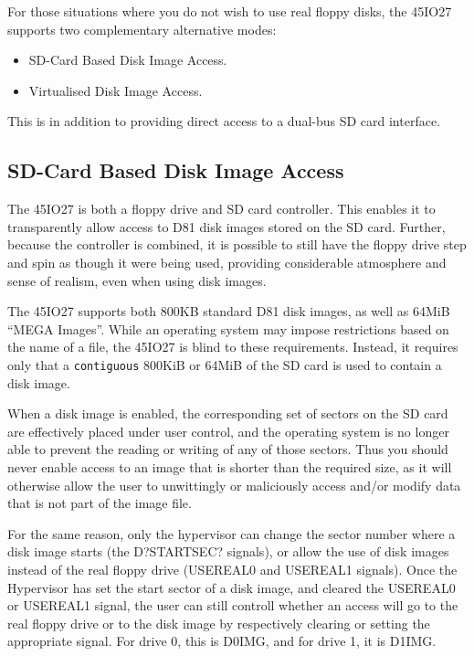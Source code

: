For those situations where you do not wish to use real floppy disks,
the 45IO27 supports two complementary alternative modes:

\begin{itemize}
\item SD-Card Based Disk Image Access.
\item Virtualised Disk Image Access.
\end{itemize}

This is in addition to providing direct access to a dual-bus SD card
interface.

\subsection{SD-Card Based Disk Image Access}

The 45IO27 is both a floppy drive and SD card controller.
This enables it to transparently allow access to D81 disk images
stored on the SD card.  Further, because the controller is combined,
it is possible to still have the floppy drive step and spin as though
it were being used, providing considerable atmosphere and sense of
realism, even when using disk images.

The 45IO27 supports both 800KB standard D81 disk images, as well as
64MiB ``MEGA Images''.  While an operating system may impose
restrictions based on the name of a file, the 45IO27 is blind to these
requirements. Instead, it requires only that a {\tt contiguous} 800KiB
or 64MiB of the SD card is used to contain a disk image.

When a disk image is enabled, the corresponding set of sectors on the
SD card are effectively placed under user control, and the operating
system is no longer able to prevent the reading or writing of any of
those sectors.  Thus you should never enable access to an image that
is shorter than the required size, as it will otherwise allow the user
to unwittingly or maliciously access and/or modify data that is not
part of the image file.

For the same reason, only the hypervisor can change the sector number
where a disk image starts (the D?STARTSEC? signals), or allow the use
of disk images instead of the real floppy drive (USEREAL0 and USEREAL1
signals).  Once the Hypervisor has set the start sector of a disk
image, and cleared the USEREAL0 or USEREAL1 signal, the user can still
controll whether an access will go to the real floppy drive or to the
disk image by respectively clearing or setting the appropriate
signal.  For drive 0, this is D0IMG, and for drive 1, it is D1IMG.

